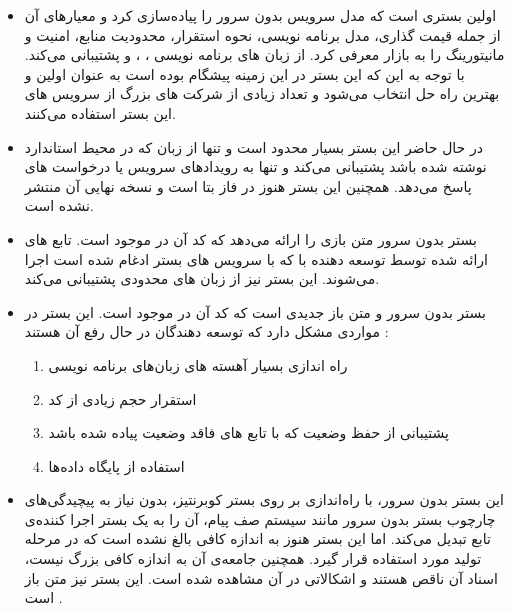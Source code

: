 \begin{itemize}
	
	\item \textbf{}  اولین بستری است که مدل سرویس بدون سرور را پیاده‌سازی کرد و معیارهای آن از جمله  قیمت گذاری، مدل برنامه نویسی، نحوه استقرار، محدودیت منابع، امنیت و مانیتورینگ را به بازار معرفی کرد.  از زبان های برنامه نویسی ، ،   و  پشتیبانی می‌کند. با توجه به این که این بستر در این زمینه پیشگام بوده است به عنوان اولین و بهترین راه حل انتخاب می‌شود و تعداد زیادی از شرکت های بزرگ از سرویس های این بستر استفاده می‌کنند.
	
	\item \textbf{}   در حال حاضر این بستر بسیار محدود است و تنها از زبان  که در محیط استاندارد  نوشته شده باشد پشتیبانی می‌کند و تنها به رویدادهای سرویس  یا درخواست های  پاسخ می‌دهد. همچنین این بستر هنوز در فاز بتا است و نسخه نهایی آن منتشر نشده است.
	
	\item \textbf{}  بستر بدون سرور متن بازی را ارائه می‌دهد که کد آن در  موجود است. تابع های ارائه شده توسط توسعه دهنده با  که با سرویس های بستر ادغام شده است اجرا می‌شوند. این بستر نیز از زبان های محدودی پشتیبانی می‌کند.
	
	\item \textbf{}  بستر بدون سرور و متن باز جدیدی است که کد آن در  موجود است. این بستر در مواردی مشکل دارد که توسعه دهندگان در حال رفع آن هستند \cite{openlambda}:
	
	\begin{enumerate}

		\item راه اندازی بسیار آهسته  های زبان‌های برنامه نویسی
		
		\item استقرار حجم زیادی از کد
		
		\item پشتیبانی از حفظ وضعیت که با تابع های فاقد وضعیت پیاده شده باشد

		\item استفاده از پایگاه داده‌ها

	\end{enumerate}

	\item \textbf{} این بستر بدون سرور، با راه‌اندازی بر روی بستر کوبرنتیز، بدون نیاز به پیچیدگی‌های چارچوب بستر بدون سرور مانند سیستم صف پیام، آن را به یک بستر اجرا کننده‌ی تابع تبدیل می‌کند. اما این بستر هنوز به اندازه کافی بالغ نشده است که در مرحله تولید مورد استفاده قرار گیرد. همچنین جامعه‌ی آن به اندازه کافی بزرگ نیست، اسناد آن ناقص هستند و اشکالاتی در آن مشاهده شده است. این بستر نیز متن باز است \cite{kubeless}.
	

\end{itemize}
